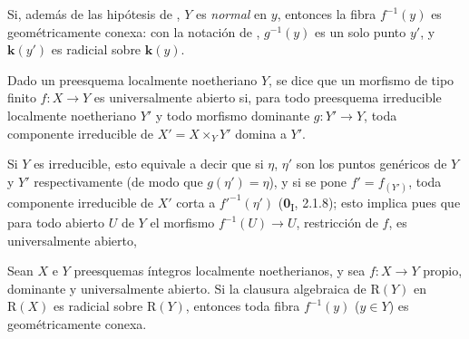 \begin{remark}[4.3.8]
\label{III.4.3.8}
\label{III.4.3.8-fr}
Si, además de las hipótesis de , $Y$ es \emph{normal} en
$y$, entonces la fibra $f^{-1}(y)$ es geométricamente conexa: con la
notación de , $g^{-1}(y)$ es un solo punto $y'$, y
$\boldsymbol{k}(y')$ es radicial sobre $\boldsymbol{k}(y)$.
\end{remark}

\begin{definition}[4.3.9]
\label{III.4.3.9-fr}
Dado un preesquema localmente noetheriano $Y$, se dice que un morfismo \textup{de
tipo finito} $f:X\to Y$ es universalmente abierto si, para todo
preesquema irreducible localmente noetheriano $Y'$ y todo morfismo dominante
$g:Y'\to Y$, toda componente irreducible de $X'=X\times_YY'$ domina a $Y'$.
\end{definition}

Si $Y$ es irreducible, esto equivale a decir que si $\eta$, $\eta'$ son los
puntos genéricos de $Y$ y $Y'$ respectivamente (de modo que
$g(\eta')=\eta$), y si se pone $f'=f_{(Y')}$, toda componente irreducible
de $X'$ corta a $f'^{-1}(\eta')$ (\textbf{0}\textsubscript{I}, 2.1.8); esto
implica pues que para todo abierto $U$ de $Y$ el morfismo
$f^{-1}(U)\to U$, restricción de $f$, es universalmente abierto,

\begin{corollary}[4.3.10]
\label{III.4.3.10}
\label{III.4.3.10-fr}
Sean $X$ e $Y$ preesquemas íntegros localmente noetherianos, y sea
$f:X\to Y$ propio, dominante y universalmente abierto. Si la clausura
algebraica de $\mathrm R(Y)$ en $\mathrm R(X)$ es radicial sobre
$\mathrm R(Y)$, entonces toda fibra $f^{-1}(y)$ ($y\in Y$) es geométricamente conexa.
\end{corollary}

